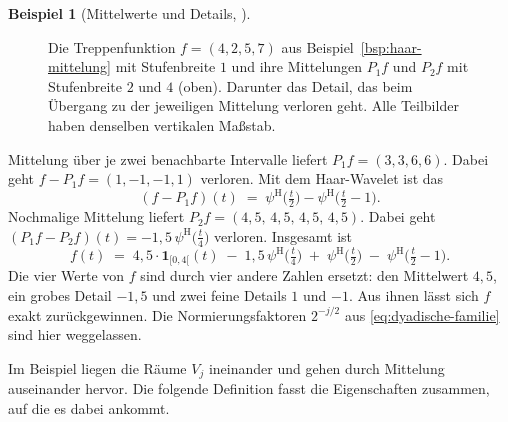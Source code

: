 \documentclass[a4paper,11pt,bibliography=totoc,listof=totoc,headinclude=true,cleardoublepage=empty,oneside]{scrbook}
\theoremstyle{plain}
\theoremstyle{definition}
\newtheorem{Beispiel}[Satz]{Beispiel}
\begin{document}
\begin{Beispiel}[Mittelwerte und Details, {\cite[Kap.~2.2.1]{lmr}}]
\begin{figure}[htbp]
  \caption[Mittelungen und Details einer Treppenfunktion]{Die Treppenfunktion
  $f=(4,2,5,7)$ aus Beispiel~\ref{bsp:haar-mittelung} mit Stufenbreite $1$
  und ihre Mittelungen $P_1 f$ und $P_2 f$ mit Stufenbreite $2$ und $4$
  (oben). Darunter das Detail, das beim Übergang zu der jeweiligen Mittelung
  verloren geht. Alle Teilbilder haben denselben vertikalen Ma\ss{}stab.}
  \label{fig:haar-mittelung}
\end{figure}

Mittelung über je zwei benachbarte Intervalle liefert $P_1 f = (3,3,6,6)$.
Dabei geht $f - P_1 f = (1,-1,-1,1)$ verloren. Mit dem Haar-Wavelet ist das
\[
  (f - P_1 f)(t) \;=\; \psi^{\mathrm H}\bigl(\tfrac t2\bigr) - \psi^{\mathrm H}\bigl(\tfrac t2 - 1\bigr).
\]
Nochmalige Mittelung liefert $P_2 f = (4{,}5,\,4{,}5,\,4{,}5,\,4{,}5)$. Dabei
geht $(P_1 f - P_2 f)(t) = -1{,}5\,\psi^{\mathrm H}\bigl(\tfrac t4\bigr)$
verloren. Insgesamt ist
\[
  f(t) \;=\; 4{,}5\cdot\mathbf 1_{[0,4[}(t) \;-\; 1{,}5\,\psi^{\mathrm H}\bigl(\tfrac t4\bigr)
  \;+\; \psi^{\mathrm H}\bigl(\tfrac t2\bigr) \;-\; \psi^{\mathrm H}\bigl(\tfrac t2 - 1\bigr).
\]
Die vier Werte von $f$ sind durch vier andere Zahlen ersetzt: den Mittelwert
$4{,}5$, ein grobes Detail $-1{,}5$ und zwei feine Details $1$ und $-1$. Aus
ihnen lässt sich $f$ exakt zurückgewinnen. Die Normierungsfaktoren $2^{-j/2}$
aus \eqref{eq:dyadische-familie} sind hier weggelassen.
\end{Beispiel}

Im Beispiel liegen die Räume $V_j$ ineinander und gehen durch Mittelung
auseinander hervor. Die folgende Definition fasst die Eigenschaften zusammen, 
auf die es dabei ankommt.
\end{document}
